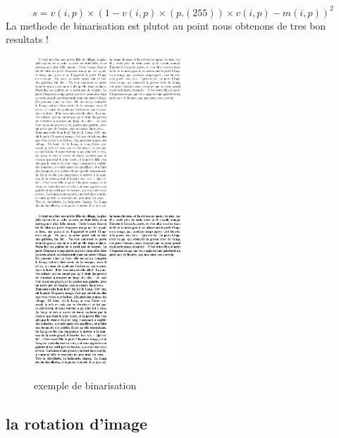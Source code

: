 \[ s = v(i,p) \times (1 - v(i,p) \times (p.(255)) \times v(i,p) - m(i,p))^{2}\]
La methode de binarisation est plutot au point nous obtenons de tres bon resultats !
\begin{figure}[h]
	\includegraphics[width=0.50\textwidth]{bin.png}
	\includegraphics[width=0.50\textwidth]{bin2.png}
	\caption{exemple de binarisation}
\end{figure}

\subsection{la rotation d'image}
